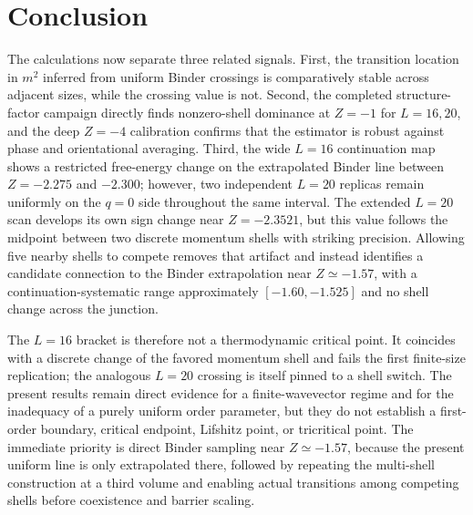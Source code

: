 \documentclass[11pt]{article}
\begin{document}
\section{Conclusion}

The calculations now separate three related signals.  First, the transition
location in $m^2$ inferred from uniform Binder crossings is comparatively
stable across adjacent sizes, while the crossing value is not.  Second, the
completed structure-factor campaign directly finds nonzero-shell dominance at
$Z=-1$ for $L=16,20$, and the deep $Z=-4$ calibration confirms that the
estimator is robust against phase and orientational averaging.  Third, the
wide $L=16$ continuation map shows a restricted free-energy change on the
extrapolated Binder line between $Z=-2.275$ and $-2.300$; however, two
independent $L=20$ replicas remain uniformly on the $q=0$ side throughout the
same interval.  The extended $L=20$ scan develops its own sign change near
$Z=-2.3521$, but this value follows the midpoint between two discrete momentum
shells with striking precision.  Allowing five nearby shells to compete
removes that artifact and instead identifies a candidate connection to the
Binder extrapolation near $Z\simeq-1.57$, with a continuation-systematic range
approximately $[-1.60,-1.525]$ and no shell change across the junction.

The $L=16$ bracket is therefore not a thermodynamic critical point.  It
coincides with a discrete change of the favored momentum shell and fails the
first finite-size replication; the analogous $L=20$ crossing is itself pinned
to a shell switch.  The present results remain direct evidence for a
finite-wavevector regime and for the inadequacy of a purely uniform order
parameter, but they do not establish a first-order boundary, critical endpoint,
Lifshitz point, or tricritical point.  The immediate priority is direct Binder
sampling near $Z\simeq-1.57$, because the present uniform line is only
extrapolated there, followed by repeating the multi-shell construction at a
third volume and enabling actual transitions among competing shells before
coexistence and barrier scaling.
\end{document}
